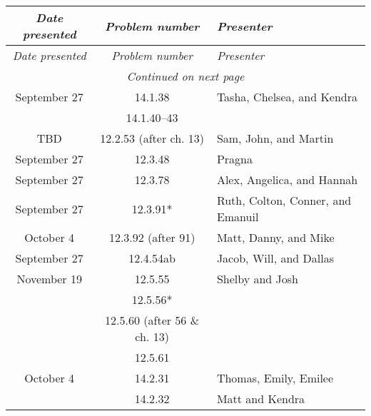 \documentclass[12pt]{amsart}
\begin{document}
    \begin{longtable}{c|c|l}
        \emph{Date presented} &\emph{Problem number} & \emph{Presenter} \\ \hline
        \endfirsthead
        \emph{Date presented} & \emph{Problem number} & \emph{Presenter} \\ \hline
        \endhead
        \hline
        \multicolumn{3}{c}{\emph{Continued on next page}} \\
        \endfoot
        \hline 
        \endlastfoot
        September 27    & 14.1.38                              & Tasha, Chelsea, and Kendra               \\
                        & 14.1.40--43                          &                                          \\
        TBD             & 12.2.53 (after ch. 13)               & Sam, John, and Martin                    \\
        September 27    & 12.3.48                              & Pragna                                   \\
        September 27    & 12.3.78                              & Alex, Angelica, and Hannah               \\
        September 27    & 12.3.91*                             & Ruth, Colton, Conner, and Emanuil        \\
        October 4       & 12.3.92 (after 91)                   & Matt, Danny, and Mike                    \\
        September 27    & 12.4.54ab                            & Jacob, Will, and Dallas                  \\
        November 19     & 12.5.55                              & Shelby and Josh                          \\
                        & 12.5.56*                             &                                          \\
                        & 12.5.60 (after 56 \& ch. 13)         &                                          \\
                        & 12.5.61                              &                                          \\
        October 4       & 14.2.31                              & Thomas, Emily, Emilee                    \\
                        & 14.2.32                              & Matt and Kendra                          \\

\end{longtable}
\end{document}
